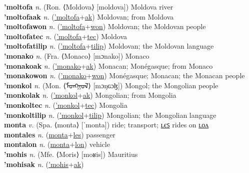 \textbf{'moltofa} \textit{n.} (Ron. ⟨Moldova⟩ [moldova])
Moldova river \label{'moltofa} \\
\textbf{'moltofaak} \textit{n.} (\hyperref['moltofa]{'moltofa}+\hyperref[ak]{ak})
Moldovan; from Moldova \label{'moltofaak} \\
\textbf{'moltofawon} \textit{n.} (\hyperref['moltofa]{'moltofa}+\hyperref[won]{won})
Moldovan; the Moldovan people \label{'moltofawon} \\
\textbf{'moltofatec} \textit{n.} (\hyperref['moltofa]{'moltofa}+\hyperref[tec]{tec})
Moldova \label{'moltofatec} \\
\textbf{'moltofatilip} \textit{n.} (\hyperref['moltofa]{'moltofa}+\hyperref[tilip]{tilip})
Moldovan; the Moldovan language \label{'moltofatilip} \\
\textbf{'monako} \textit{n.} (Fra. ⟨Monaco⟩ [mɔnako])
Monaco \label{'monako} \\
\textbf{'monakoak} \textit{n.} (\hyperref['monako]{'monako}+\hyperref[ak]{ak})
Monacan; Monégasque; from Monaco \label{'monakoak} \\
\textbf{'monakowon} \textit{n.} (\hyperref['monako]{'monako}+\hyperref[won]{won})
Monégasque; Monacan; the Monacan people \label{'monakowon} \\
\textbf{'monkol} \textit{n.} (Mon. ⟨ᠮᠣᠩᠭᠣᠯ⟩ [mɔŋɢɔɮ])
Mongol; the Mongolian people \label{'monkol} \\
\textbf{'monkolak} \textit{n.} (\hyperref['monkol]{'monkol}+\hyperref[ak]{ak})
Mongolian; from Mongolia \label{'monkolak} \\
\textbf{'monkoltec} \textit{n.} (\hyperref['monkol]{'monkol}+\hyperref[tec]{tec})
Mongolia \label{'monkoltec} \\
\textbf{'monkoltilip} \textit{n.} (\hyperref['monkol]{'monkol}+\hyperref[tilip]{tilip})
Mongolian; the Mongolian language \label{'monkoltilip} \\
\textbf{monta} \textit{v.} (Spa. ⟨monta⟩ [ˈmonta])
ride; transport; \hyperref[montales]{ʟєꜱ} rides on \hyperref[montalon]{ʟᴏᴧ} \label{monta} \\
\textbf{montales} \textit{n.} (\hyperref[monta]{monta}+\hyperref[les]{les})
passenger \label{montales} \\
\textbf{montalon} \textit{n.} (\hyperref[monta]{monta}+\hyperref[lon]{lon})
vehicle \label{montalon} \\
\textbf{'mohis} \textit{n.} (Mfe. ⟨Moris⟩ [moʁis])
Mauritius \label{'mohis} \\
\textbf{'mohisak} \textit{n.} (\hyperref['mohis]{'mohis}+\hyperref[ak]{ak})
